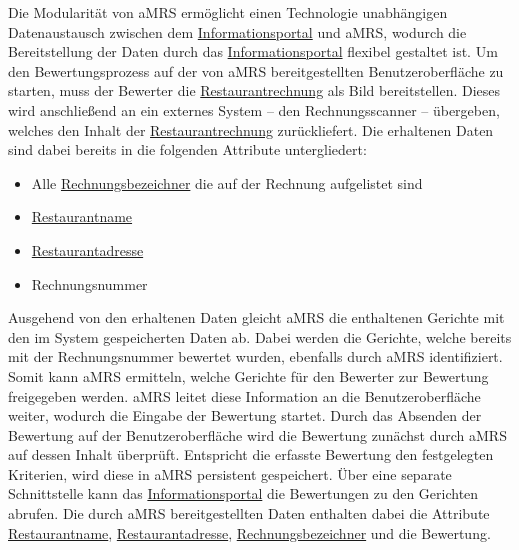 Die Modularität von \ac{aMRS} ermöglicht einen Technologie unabhängigen Datenaustausch zwischen dem \hyperref[gls:informationsportal]{Informationsportal} und \ac{aMRS}, wodurch die Bereitstellung der Daten durch das \hyperref[gls:informationsportal]{Informationsportal} flexibel gestaltet ist.
\newparagraph
Um den Bewertungsprozess auf der von \ac{aMRS} bereitgestellten Benutzeroberfläche zu starten, muss der Bewerter die \hyperref[gls:restaurantRechnung]{Restaurantrechnung} als Bild bereitstellen.
Dieses wird anschließend an ein externes System -- den Rechnungsscanner -- übergeben, welches den Inhalt der \hyperref[gls:restaurantRechnung]{Restaurantrechnung} zurückliefert.
Die erhaltenen Daten sind dabei bereits in die folgenden Attribute untergliedert:
\begin{itemize}
  \item Alle \hyperref[gls:Rechnungsbezeichner]{Rechnungsbezeichner} die auf der Rechnung aufgelistet sind
  \item \hyperref[gls:restaurantname]{Restaurantname}
  \item \hyperref[gls:restaurantAdresse]{Restaurantadresse}
  \item Rechnungsnummer
\end{itemize}
Ausgehend von den erhaltenen Daten gleicht \ac{aMRS} die enthaltenen Gerichte mit den im System gespeicherten Daten ab.
Dabei werden die Gerichte, welche bereits mit der Rechnungsnummer bewertet wurden, ebenfalls durch \ac{aMRS} identifiziert.
Somit kann \ac{aMRS} ermitteln, welche Gerichte für den Bewerter zur Bewertung freigegeben werden.
\ac{aMRS} leitet diese Information an die Benutzeroberfläche weiter, wodurch die Eingabe der Bewertung startet.
\newparagraph
Durch das Absenden der Bewertung auf der Benutzeroberfläche wird die Bewertung zunächst durch \ac{aMRS} auf dessen Inhalt überprüft.
Entspricht die erfasste Bewertung den festgelegten Kriterien, wird diese in \ac{aMRS} persistent gespeichert.
\newparagraph
Über eine separate Schnittstelle kann das \hyperref[gls:informationsportal]{Informationsportal} die Bewertungen zu den Gerichten abrufen.
Die durch \ac{aMRS} bereitgestellten Daten enthalten dabei die Attribute \hyperref[gls:restaurantname]{Restaurantname}, \hyperref[gls:restaurantAdresse]{Restaurantadresse}, \hyperref[gls:Rechnungsbezeichner]{Rechnungsbezeichner} und die Bewertung.
